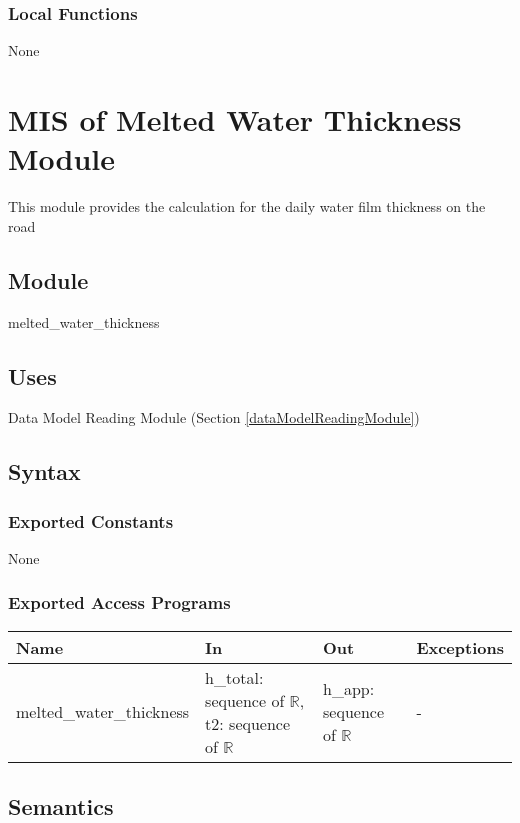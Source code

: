 \documentclass[12pt, titlepage]{article}
\begin{document}
\subsubsection{Local Functions}
None
\newpage


\section{MIS of Melted Water Thickness Module} \label{meltedWaterThicknessModule}
This module provides the calculation for the daily water film thickness on the road

\subsection{Module}
melted\_water\_thickness

\subsection{Uses}
Data Model Reading Module (Section \ref{dataModelReadingModule})


\subsection{Syntax}

\subsubsection{Exported Constants}
None
\subsubsection{Exported Access Programs}

\begin{center}
\begin{tabular}{p{4cm} p{4.5cm} p{4.5cm} p{2cm}}
\hline
\textbf{Name} & \textbf{In} & \textbf{Out} & \textbf{Exceptions} \\
\hline
melted\_water\_thickness & h\_total: sequence of $\mathbb{R}$, t2: sequence of $\mathbb{R}$ & h\_app: sequence of $\mathbb{R}$ & - \\

\hline
\end{tabular}
\end{center}

\subsection{Semantics}
\end{document}
